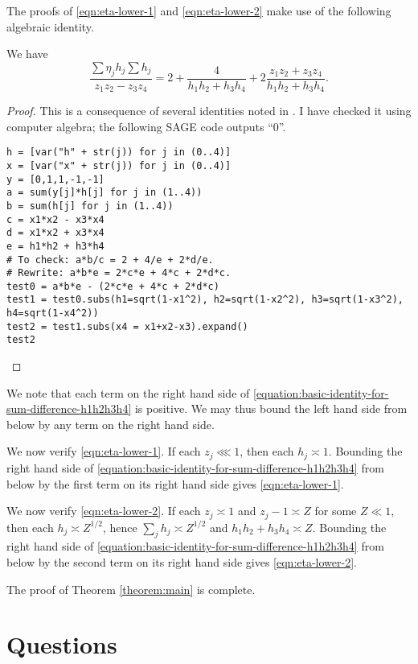 \documentclass[reqno]{amsart} 
\begin{document}
The proofs of \eqref{eqn:eta-lower-1} and \eqref{eqn:eta-lower-2} make use of the following algebraic identity.
\begin{lemma}\label{lemma:algebraic-identity}
  We have
  \begin{equation}\label{equation:basic-identity-for-sum-difference-h1h2h3h4}
  \frac{\sum \eta_j h_j \sum h_j
  }{
    z _1 z _2 - z _3 z _4 
  }
  =
  2 + \frac{4}{ h _1 h _2 + h _3 h _4 }
  + 2 \frac{z _1 z _2 + z _3 z _4 }{ h _1 h _2 + h _3 h _4}.
\end{equation}
\end{lemma}
\begin{proof}
  This is a consequence of several identities noted in \cite{ki20234}.  I have checked it using computer algebra; the following SAGE code outputs ``$0$''.
\begin{verbatim}
h = [var("h" + str(j)) for j in (0..4)]
x = [var("x" + str(j)) for j in (0..4)]
y = [0,1,1,-1,-1]
a = sum(y[j]*h[j] for j in (1..4))
b = sum(h[j] for j in (1..4))
c = x1*x2 - x3*x4
d = x1*x2 + x3*x4
e = h1*h2 + h3*h4
# To check: a*b/c = 2 + 4/e + 2*d/e.
# Rewrite: a*b*e = 2*c*e + 4*c + 2*d*c.
test0 = a*b*e - (2*c*e + 4*c + 2*d*c)
test1 = test0.subs(h1=sqrt(1-x1^2), h2=sqrt(1-x2^2), h3=sqrt(1-x3^2), h4=sqrt(1-x4^2))
test2 = test1.subs(x4 = x1+x2-x3).expand()
test2
\end{verbatim}
\end{proof}
We note that each term on the right hand side of \eqref{equation:basic-identity-for-sum-difference-h1h2h3h4} is positive.  We may thus bound the left hand side from below by any term on the right hand side.

We now verify \eqref{eqn:eta-lower-1}.  If each $z_j \lll 1$, then each $h_j \asymp 1$.  Bounding the right hand side of \eqref{equation:basic-identity-for-sum-difference-h1h2h3h4} from below by the first term on its right hand side gives \eqref{eqn:eta-lower-1}.

We now verify \eqref{eqn:eta-lower-2}.  If each $z_j \asymp 1$ and $z_j - 1 \asymp Z$ for some $Z \ll 1$, then each $h_j \asymp Z ^{1/2}$, hence $\sum_j h_j \asymp Z^{1/2}$ and $h_1 h_2 + h_3 h_4 \asymp Z$.  Bounding the right hand side of \eqref{equation:basic-identity-for-sum-difference-h1h2h3h4} from below by the second term on its right hand side gives \eqref{eqn:eta-lower-2}.

The proof of Theorem \ref{theorem:main} is complete.

\section{Questions}
\end{document}

